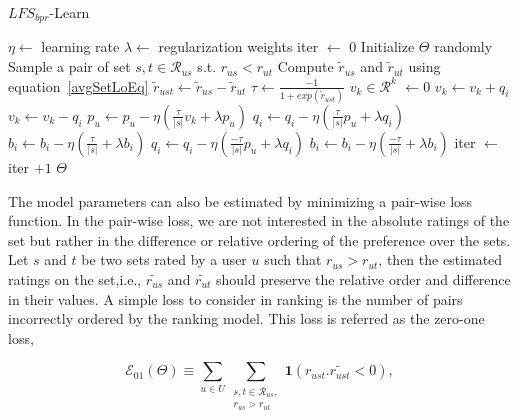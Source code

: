 \begin{algorithm}[t]
  \caption{$LFS_{bpr}$-Learn}
  \label{alg-lfs-bpr}
  \begin{algorithmic}[1]
      \State $\eta \gets$ learning rate
      \State $\lambda \gets$ regularization weights
      \State iter $\gets$ 0
      \State Initialize $\Theta$ randomly
        \State Sample  a pair of set $s,t \in \mathcal{R}_{us}$ s.t. $r_{us} < r_{ut}$
        \State Compute $\tilde{r}_{us} $ and $\tilde{r}_{ut}$ using
        equation~\ref{avgSetLoEq}
        \State $\tilde{r}_{ust} \gets \tilde{r}_{us} - \tilde{r}_{ut}$
        \State $\tau \gets \frac{-1}{1 + exp(\tilde{r}_{ust})}$
          \State $v_k \in \mathcal{R}^k$  $\gets 0$
            \State $v_k \gets v_k + q_i$
          \EndFor
            \State $v_k \gets v_k - q_i$
          \EndFor
          \State $p_u \gets p_u - \eta(\frac{\tau}{|s|} v_k + \lambda p_u)$
            \State $q_i \gets q_i - \eta(\frac{\tau}{|s|} p_u + \lambda q_i)$  
            \State $b_i \gets b_i - \eta(\frac{\tau}{|s|} + \lambda b_i)$
          \EndFor
            \State $q_i \gets q_i - \eta(\frac{-\tau}{|s|} p_u + \lambda q_i)$  
            \State $b_i \gets b_i - \eta(\frac{-\tau}{|s|} + \lambda b_i)$
          \EndFor
        \EndFor
        \State iter $\gets $ iter $ + 1$
      \EndWhile
      \State \Return $\Theta$
    \EndProcedure
  \end{algorithmic}
\end{algorithm}



\iffalse
The model parameters can also be estimated by minimizing a pair-wise loss
function. In the pair-wise loss, we are not interested in the absolute ratings
of the set but rather in the difference or relative ordering of the preference
over the sets. Let $s$ and $t$ be two sets rated by a user $u$ such that $r_{us}
> r_{ut}$, then the estimated ratings on the set,i.e., $\tilde{r_{us}}$ and
$\tilde{r_{ut}}$ should preserve the relative order and difference in their
values. A simple loss to consider in ranking is the number of pairs incorrectly 
ordered by the ranking model. This loss is referred as the zero-one loss,

\begin{equation} \label{eq_01}
  \mathcal{E}_{01}(\Theta) \equiv \sum_{u \in U} \sum_{\substack{s,t \in
\mathcal{R}_{us},\\ r_{us} > r_{ut}}} \bm{1}(r_{ust} . \tilde{r_{ust}} < 0),
\end{equation}

